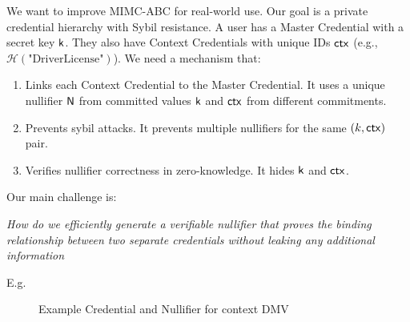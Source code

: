 We want to improve MIMC-ABC for real-world use. Our goal is a private credential hierarchy with Sybil resistance. A user has a Master Credential with a secret key $\mathsf{k}$. They also have Context Credentials with unique IDs $\mathsf{ctx}$ (e.g., $\mathcal{H}(\text{"DriverLicense"})$). We need a mechanism that:
\begin{enumerate}
    \item Links each Context Credential to the Master Credential. It uses a unique nullifier $\mathsf{N}$ from committed values $\mathsf{k}$ and $\mathsf{ctx}$ from different commitments.
    \item Prevents sybil attacks. It prevents multiple nullifiers for the same $(k, \mathsf{ctx})$ pair.
    \item Verifies nullifier correctness in zero-knowledge. It hides $\mathsf{k}$ and $\mathsf{ctx}$.
\end{enumerate}


Our main challenge is:
\begin{center}
\emph{How do we efficiently generate a verifiable nullifier that proves the binding relationship between two separate credentials without leaking any additional information}
\end{center}

E.g.
\begin{figure}
        \begin{pchstack}[boxed, center, space=4em]
            \begin{pcvstack}
            \end{pcvstack}
            \pcvspace
            \begin{pcvstack}
            \end{pcvstack}
            \begin{pcvstack}
            \end{pcvstack}
        \end{pchstack}
    \caption{Example Credential and Nullifier for context DMV}
    \label{fig:two-creds}
\end{figure}



